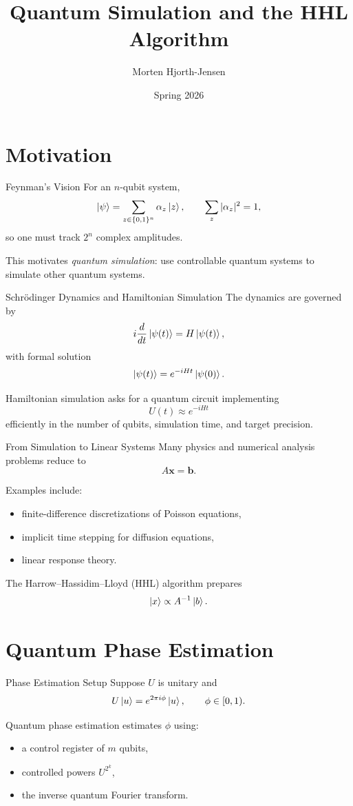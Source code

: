 \documentclass[aspectratio=169]{beamer}
\title{Quantum Simulation and the HHL Algorithm}
\author{Morten Hjorth-Jensen}
\date{Spring 2026}
\begin{document}
\frame{\titlepage}

\section{Motivation}

\begin{frame}{Feynman's Vision}
For an \(n\)-qubit system,
\[
\ket{\psi}=\sum_{z\in\{0,1\}^n} \alpha_z \ket{z},
\qquad
\sum_z |\alpha_z|^2=1,
\]
so one must track \(2^n\) complex amplitudes.

\medskip

This motivates \emph{quantum simulation}: use controllable quantum systems to simulate other quantum systems.
\end{frame}

\begin{frame}{Schrödinger Dynamics and Hamiltonian Simulation}
The dynamics are governed by
\[
i\frac{d}{dt}\ket{\psi(t)} = H\ket{\psi(t)},
\]
with formal solution
\[
\ket{\psi(t)} = e^{-iHt}\ket{\psi(0)}.
\]

Hamiltonian simulation asks for a quantum circuit implementing
\[
U(t)\approx e^{-iHt}
\]
efficiently in the number of qubits, simulation time, and target precision.
\end{frame}

\begin{frame}{From Simulation to Linear Systems}
Many physics and numerical analysis problems reduce to
\[
A\bm{x}=\bm{b}.
\]

Examples include:
\begin{itemize}
    \item finite-difference discretizations of Poisson equations,
    \item implicit time stepping for diffusion equations,
    \item linear response theory.
\end{itemize}

The Harrow--Hassidim--Lloyd (HHL) algorithm prepares
\[
\ket{x}\propto A^{-1}\ket{b}.
\]
\end{frame}

\section{Quantum Phase Estimation}

\begin{frame}{Phase Estimation Setup}
Suppose \(U\) is unitary and
\[
U\ket{u}=e^{2\pi i \phi}\ket{u},
\qquad
\phi\in[0,1).
\]

Quantum phase estimation estimates \(\phi\) using:
\begin{itemize}
    \item a control register of \(m\) qubits,
    \item controlled powers \(U^{2^k}\),
    \item the inverse quantum Fourier transform.
\end{itemize}
\end{frame}
\end{document}
